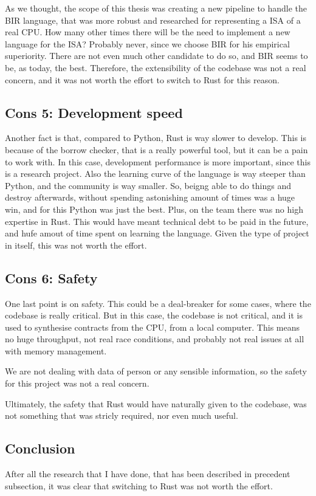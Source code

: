 As we thought, the scope of this thesis was creating a new pipeline to handle
the BIR language, that was more robust and researched for representing a ISA of a
real CPU. How many other times there will be the need to implement a new
language for the ISA? Probably never, since we choose BIR for his empirical
superiority. There are not even much other candidate to do so, and BIR seems to
be, as today, the best. Therefore, the extensibility of the codebase was not a
real concern, and it was not worth the effort to switch to Rust for this reason.

\subsection[Development speed]{Cons 5: Development speed}
Another fact is that, compared to Python, Rust is way slower to develop. This is
because of the borrow checker, that is a really powerful tool, but it can be a
pain to work with. In this case, development performance is more important, since
this is a research project. Also the learning curve of the language is way
steeper than Python, and the community is way smaller. So, beigng able to do things
and destroy afterwards, without spending astonishing amount of times was a huge
win, and for this Python was just the best. Plus, on the team there was no high expertise
in Rust. This would have meant technical debt to be paid in the future, and hufe
amout of time spent on learning the language. Given the type of project in
itself, this was not worth the effort.

\subsection[Safety]{Cons 6: Safety}
One last point is on safety. This could be a deal-breaker for some cases, where the
codebase is really critical. But in this case, the codebase is not critical, and
it is used to synthesise contracts from the CPU, from a local computer. This
means no huge throughput, not real race conditions, and probably not real issues
at all with memory management.

We are not dealing with data of person or any sensible information, so the safety
for this project was not a real concern.

Ultimately, the safety that Rust would have naturally given to the codebase, was
not something that was stricly required, nor even much useful.

\subsection[Conclusion]{Conclusion}
After all the research that I have done, that has been described in precedent subsection,
it was clear that switching to Rust was not worth the effort.

